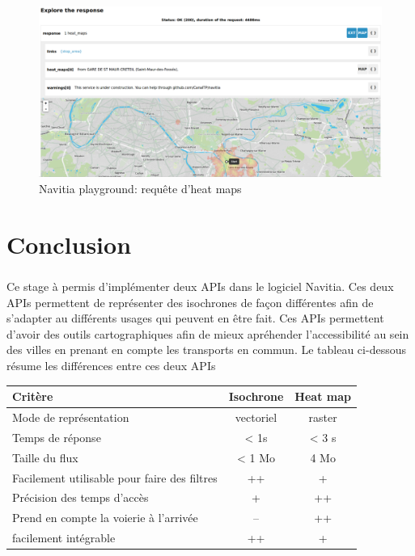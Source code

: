\documentclass[a4paper]{report}
\begin{document}
\begin{figure}[H]
	\begin{center}
		\includegraphics[width=400pt]{image/n_p_heat_map}
		\caption{Navitia playground: requête d'heat maps}
		\label{Navitia playground: requête d'heat maps}
	\end{center}
\end{figure}

\chapter*{Conclusion}

\paragraph{} Ce stage à permis d'implémenter deux APIs dans le logiciel Navitia. Ces deux APIs permettent de représenter des isochrones de façon différentes afin de s'adapter au différents usages qui peuvent en être fait. Ces APIs permettent d'avoir des outils cartographiques afin de mieux apréhender l'accessibilité au sein des villes en prenant en compte les transports en commun. Le tableau ci-dessous résume les différences entre ces deux APIs\\

\begin{center}
  \begin{tabular} {|l|c|c|}
  \hline
  Critère & Isochrone & Heat map \\
  \hline
  Mode de représentation & vectoriel & raster \\
  \hline
  Temps de réponse & < 1s &  < 3 s \\
  \hline
  Taille du flux & < 1 Mo & 4 Mo \\
  \hline
  Facilement utilisable pour faire des filtres & ++ & + \\
  \hline
   Précision des temps d'accès & + & ++ \\
  \hline
  Prend en compte la voierie à l'arrivée & -- & ++ \\
  \hline
  facilement intégrable & ++ & + \\
  \hline
  \end{tabular}
\end{center}
\end{document}
